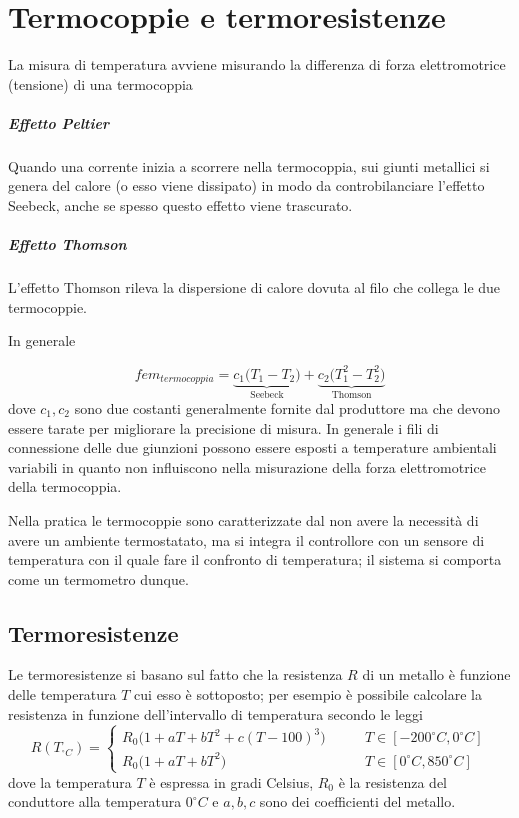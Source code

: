 \chapter{Termocoppie e termoresistenze}
	La misura di temperatura avviene misurando la differenza di forza elettromotrice (tensione) di una termocoppia
	
	\paragraph{Effetto Peltier} Quando una corrente inizia a scorrere nella termocoppia, sui giunti metallici si genera del calore (o esso viene dissipato) in modo da controbilanciare l'effetto Seebeck, anche se spesso questo effetto viene trascurato.
	
	\paragraph{Effetto Thomson} L'effetto Thomson rileva la dispersione di calore dovuta al filo che collega le due termocoppie.
	
	In generale
	
	\[ fem_{termocoppia} = \underbrace{c_1 \big(T_1-T_2\big)}_\textrm{Seebeck} +\underbrace{ c_2\big(T_1^2-T_2^2\big)}_\textrm{Thomson}\]
	dove $c_1,c_2$ sono due costanti generalmente fornite dal produttore ma che devono essere tarate per migliorare la precisione di misura. In generale i fili di connessione delle due giunzioni possono essere esposti a temperature ambientali variabili in quanto non influiscono nella misurazione della forza elettromotrice della termocoppia.
	
	Nella pratica le termocoppie sono caratterizzate dal non avere la necessità di avere un ambiente termostatato, ma si integra il controllore con un sensore di temperatura con il quale fare il confronto di temperatura; il sistema si comporta come un termometro dunque.
	
	
\section{Termoresistenze}
	Le termoresistenze si basano sul fatto che la resistenza $R$ di un metallo è funzione delle temperatura $T$ cui esso è sottoposto; per esempio è possibile calcolare la resistenza in funzione dell'intervallo di temperatura secondo le leggi
	\[ R(T_{^\circ C}) = \begin{cases}
		R_0\big(1 + aT + bT^2 + c(T-100)^3\big) \qquad & T\in [-200^\circ C, 0^\circ C] \\
		R_0\big(1 + aT + bT^2\big) \qquad &T\in [0^\circ C,850^\circ C] 
	\end{cases}\]
	dove la temperatura $T$ è espressa in gradi Celsius, $R_0$ è la resistenza del conduttore alla temperatura $0^\circ C$ e $a,b,c$ sono dei coefficienti del metallo.
	
